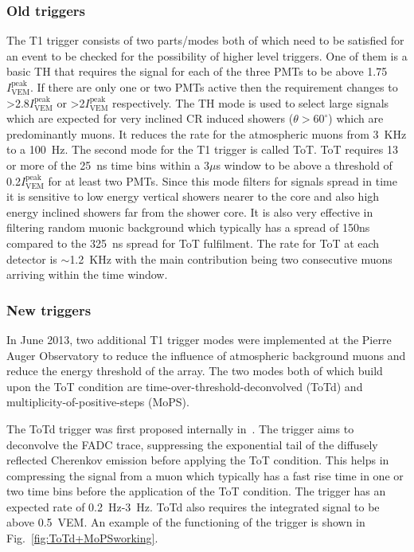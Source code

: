 \subsubsection{Old triggers}
\label{sec:Sur_det_trig_old}
The T1 trigger consists of two parts/modes both of which need to be satisfied for an event to be checked for the possibility of higher level triggers. One of them is a basic \gls{TH} that requires the signal for each of the three PMTs to be above 1.75$I_{\text{VEM}}^{\text{peak}}$. If there are only one or two PMTs active then the requirement changes to >2.8$I_{\text{VEM}}^{\text{peak}}$ or >2$I_{\text{VEM}}^{\text{peak}}$ respectively. The TH mode is used to select large signals which are expected for very inclined CR induced showers ($\theta >60^{\circ}$) which are predominantly muons. It reduces the rate for the atmospheric muons from 3 KHz to a 100 Hz. The second mode for the T1 trigger is called \gls{ToT}. ToT requires 13 or more of the 25 ns time bins within a 3$\mu$s window to be above a threshold of 0.2$I_{\text{VEM}}^{\text{peak}}$ for at least two PMTs. Since this mode filters for signals spread in time it is sensitive to low energy vertical showers nearer to the core and also high energy inclined showers far from the shower core. It is also very effective in filtering random muonic background which typically has a spread of 150ns compared to the 325 ns spread for ToT fulfilment. The rate for ToT at each detector is $\sim$1.2 KHz with the main contribution being two consecutive muons arriving within the time window. 

\subsubsection{New triggers}
\label{sec:Sur_det_trig_new}
In June 2013, two additional T1 trigger modes were implemented at the Pierre Auger Observatory to reduce the influence of atmospheric background muons and reduce the energy threshold of the array. The two modes both of which build upon the ToT condition are time-over-threshold-deconvolved (ToTd) and multiplicity-of-positive-steps (MoPS).

The ToTd trigger was first proposed internally in~\cite{gap_note_2009}. The trigger aims to deconvolve the FADC trace, suppressing the exponential tail of the diffusely reflected Cherenkov emission before applying the ToT condition. This helps in compressing the signal from a muon which typically has a fast rise time in one or two time bins before the application of the ToT condition. The trigger has an expected rate of 0.2 Hz-3 Hz. ToTd also requires the integrated signal to be above 0.5 VEM. An example of the functioning of the trigger is shown in Fig.~\ref{fig:ToTd+MoPSworking}. 

